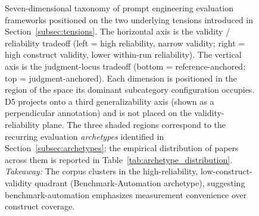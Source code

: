 \documentclass[acmsmall, nonacm, screen]{acmart}
\begin{document}
\begin{figure}[!t]
{%
}
\caption{Seven-dimensional taxonomy of prompt engineering evaluation
frameworks positioned on the two underlying tensions introduced in
Section~\ref{subsec:tensions}. The horizontal axis is the validity /
reliability tradeoff (left = high reliability, narrow validity;
right = high construct validity, lower within-run reliability). The
vertical axis is the judgment-locus tradeoff
(bottom = reference-anchored; top = judgment-anchored). Each
dimension is positioned in the region of the space its dominant
subcategory configuration occupies. D5 projects onto a third
generalizability axis (shown as a perpendicular annotation) and is
not placed on the validity-reliability plane. The three shaded
regions correspond to the recurring evaluation \emph{archetypes}
identified in Section~\ref{subsec:archetypes}; the empirical
distribution of papers across them is reported in
Table~\ref{tab:archetype_distribution}.
\textit{Takeaway:} The corpus clusters in the high-reliability, low-construct-validity quadrant (Benchmark-Automation archetype), suggesting benchmark-automation emphasizes measurement convenience over construct coverage.}
\label{fig:taxonomy}
\end{figure}
\end{document}
